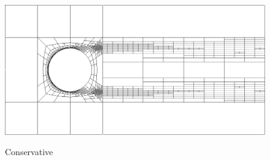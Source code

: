 \documentclass{beamer}
\begin{document}
\begin{frame}
{\begin{columns}
\begin{column}{0.49\textwidth}
\begin{figure}
\includegraphics[width=1.0\textwidth]{Hemker/modified8c_mesh.png}

Conservative
\end{figure}
\end{column}
\end{columns}
}
\end{frame}

\end{document}

